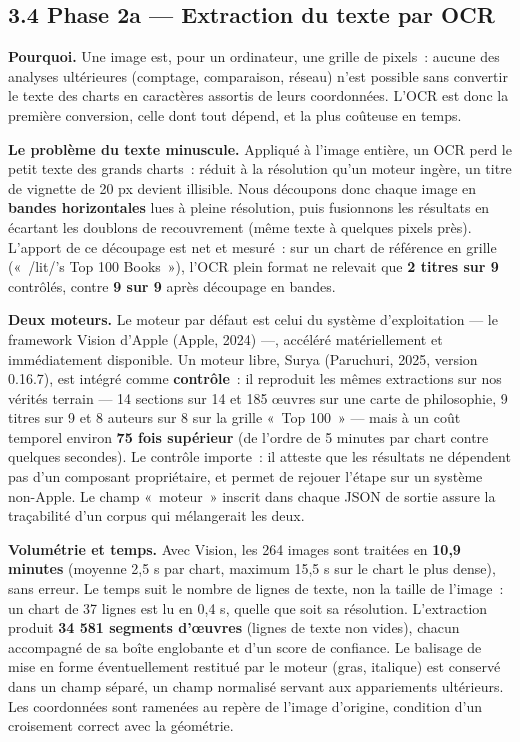 \documentclass[11pt,a4paper]{article}
\begin{document}
\subsection*{3.4 Phase 2a --- Extraction du texte par OCR}

\textbf{Pourquoi.} Une image est, pour un ordinateur, une grille de pixels~: aucune des analyses ultérieures (comptage, comparaison, réseau) n'est possible sans convertir le texte des charts en caractères assortis de leurs coordonnées. L'OCR est donc la première conversion, celle dont tout dépend, et la plus coûteuse en temps.

\textbf{Le problème du texte minuscule.} Appliqué à l'image entière, un OCR perd le petit texte des grands charts~: réduit à la résolution qu'un moteur ingère, un titre de vignette de 20 px devient illisible. Nous découpons donc chaque image en \textbf{bandes horizontales} lues à pleine résolution, puis fusionnons les résultats en écartant les doublons de recouvrement (même texte à quelques pixels près). L'apport de ce découpage est net et mesuré~: sur un chart de référence en grille («~/lit/'s Top 100 Books~»), l'OCR plein format ne relevait que \textbf{2 titres sur 9} contrôlés, contre \textbf{9 sur 9} après découpage en bandes.

\textbf{Deux moteurs.} Le moteur par défaut est celui du système d'exploitation --- le framework Vision d'Apple (Apple, 2024) ---, accéléré matériellement et immédiatement disponible. Un moteur libre, Surya (Paruchuri, 2025, version 0.16.7), est intégré comme \textbf{contrôle}~: il reproduit les mêmes extractions sur nos vérités terrain --- 14 sections sur 14 et 185 œuvres sur une carte de philosophie, 9 titres sur 9 et 8 auteurs sur 8 sur la grille «~Top 100~» --- mais à un coût temporel environ \textbf{75 fois supérieur} (de l'ordre de 5 minutes par chart contre quelques secondes). Le contrôle importe~: il atteste que les résultats ne dépendent pas d'un composant propriétaire, et permet de rejouer l'étape sur un système non-Apple. Le champ «~moteur~» inscrit dans chaque JSON de sortie assure la traçabilité d'un corpus qui mélangerait les deux.

\textbf{Volumétrie et temps.} Avec Vision, les 264 images sont traitées en \textbf{10,9 minutes} (moyenne 2,5 s par chart, maximum 15,5 s sur le chart le plus dense), sans erreur. Le temps suit le nombre de lignes de texte, non la taille de l'image~: un chart de 37 lignes est lu en 0,4 s, quelle que soit sa résolution. L'extraction produit \textbf{34 581 segments d'œuvres} (lignes de texte non vides), chacun accompagné de sa boîte englobante et d'un score de confiance. Le balisage de mise en forme éventuellement restitué par le moteur (gras, italique) est conservé dans un champ séparé, un champ normalisé servant aux appariements ultérieurs. Les coordonnées sont ramenées au repère de l'image d'origine, condition d'un croisement correct avec la géométrie.
\end{document}
